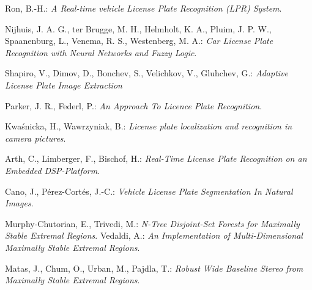 \documentclass[11pt,a4paper,draft]{article}
\begin{document}
\begin{thebibliography}{99}
%



 Ron, B.-H.: \textit{A Real-time vehicle License Plate Recognition (LPR) System}.

 Nijhuis, J. A. G., ter Brugge, M. H., Helmholt, K. A., Pluim, J. P. W., Spaanenburg, L., Venema, R. S., Westenberg, M. A.: \textit{Car License Plate Recognition with Neural Networks and Fuzzy Logic}.

 Shapiro, V., Dimov, D., Bonchev, S., Velichkov, V., Gluhchev, G.: \textit{Adaptive License Plate Image Extraction}

 Parker, J. R., Federl, P.: \textit{An Approach To Licence Plate Recognition}.

 Kwa\'snicka, H., Wawrzyniak, B.: \textit{License plate localization and recognition in camera pictures}.

 Arth, C., Limberger, F., Bischof, H.: \textit{Real-Time License Plate Recognition on an Embedded DSP-Platform}.

 Cano, J., Pérez-Cortés, J.-C.: \textit{Vehicle License Plate Segmentation In Natural Images}.







 Murphy-Chutorian, E., Trivedi, M.: \textit{N-Tree Disjoint-Set Forests for Maximally Stable Extremal Regions}.
 Vedaldi, A.: \textit{An Implementation of Multi-Dimensional Maximally Stable Extremal Regions}.

 Matas, J., Chum, O., Urban, M., Pajdla, T.: \textit{Robust Wide Baseline Stereo from Maximally Stable Extremal Regions}.


\end{thebibliography}
\end{document}
